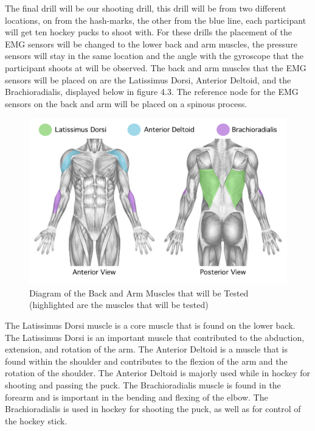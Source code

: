 The final drill will be our shooting drill, this drill will be from two different locations, on from the hash-marks, the other from the blue line, each participant will get ten hockey pucks to shoot with. For these drills the placement of the EMG sensors will be changed to the lower back and arm muscles, the pressure sensors will stay in the same location and the angle with the gyroscope that the participant shoots at will be observed. The back and arm muscles that the EMG sensors will be placed on are the Latissimus Dorsi, Anterior Deltoid, and the Brachioradialis, displayed below in figure 4.3\cite{5}. The reference node for the EMG sensors on the back and arm will be placed on a spinous process.  
\par
\begin{figure}[htb]
\centering
\includegraphics[scale=0.5]{Progress_Report/figs/shootingmuscles.png}
\caption{Diagram of the Back and Arm Muscles that will be Tested (highlighted are the muscles that will be tested)\cite{6}}
\label{fig:ShootingMuscles}
\end{figure}
\par
The Latissimus Dorsi muscle is a core muscle that is found on the lower back. The Latissimus Dorsi is an important muscle that contributed to the abduction, extension, and rotation of the arm\cite{5}. The Anterior Deltoid is a muscle that is found within the shoulder and contributes to the flexion of the arm and the rotation of the shoulder\cite{5}. The Anterior Deltoid is majorly used while in hockey for shooting and passing the puck\cite{7}. The Brachioradialis muscle is found in the forearm and is important in the bending and flexing of the elbow\cite{5}. The Brachioradialis is used in hockey for shooting the puck, as well as for control of the hockey stick\cite{7}.
